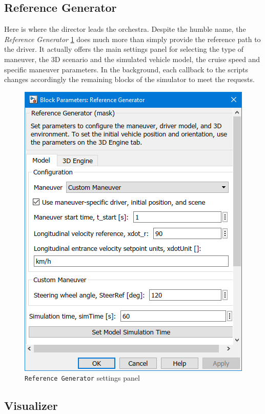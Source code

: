 		\subsection{Reference Generator}

		Here is where the director leads the orchestra. Despite the humble name, the \emph{Reference Generator} \ref{fig:refgen-cfg} does much more than simply provide the
		reference path to the driver.
		It actually offers the main settings panel for selecting the type of maneuver, the 3D scenario and the simulated vehicle model, the cruise speed and specific maneuver
		parameters. In the background, each callback to the scripts changes accordingly the remaining blocks of the simulator to meet the requests.
		\begin{figure}
			\centering
			\includegraphics[height=0.3\textheight]{Images/Simulator/sim-refgen-cfg}
			\caption{\lstinline{Reference Generator} settings panel}
			\label{fig:refgen-cfg}
		\end{figure}


		\subsection{Visualizer}

